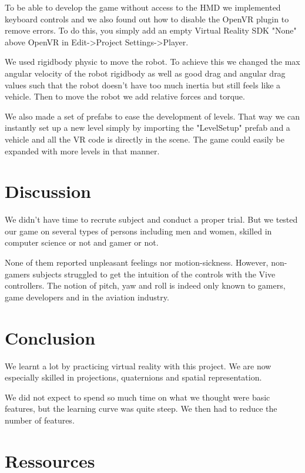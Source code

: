 \documentclass[12pt]{article}
\begin{document}
To be able to develop the game without access to the HMD we implemented keyboard controls and we also found out how to disable the OpenVR plugin to remove errors. To do this, you simply add an empty Virtual Reality SDK "None" above OpenVR in Edit->Project Settings->Player.

We used rigidbody physic to move the robot. To achieve this we changed the max angular velocity of the robot rigidbody as well as good drag and angular drag values such that the robot doesn't have too much inertia but still feels like a vehicle. Then to move the robot we add relative forces and torque.

We also made a set of prefabs to ease the development of levels. That way we can instantly set up a new level simply by importing the "LevelSetup" prefab and a vehicle and all the VR code is directly in the scene. The game could easily be expanded with more levels in that manner.


\section{Discussion}

We didn't have time to recrute subject and conduct a proper trial. But we tested our game on several types of persons including men and women, skilled in computer science or not and gamer or not.

None of them reported unpleasant feelings nor motion-sickness. However, non-gamers subjects struggled to get the intuition of the controls with the Vive controllers. The notion of pitch, yaw and roll is indeed only known to gamers, game developers and in the aviation industry.

\section{Conclusion}

We learnt a lot by practicing virtual reality with this project. We are now especially skilled in projections, quaternions and spatial representation.

We did not expect to spend so much time on what we thought were basic features, but the learning curve was quite steep. We then had to reduce the number of features.

\section{Ressources}
\end{document}

